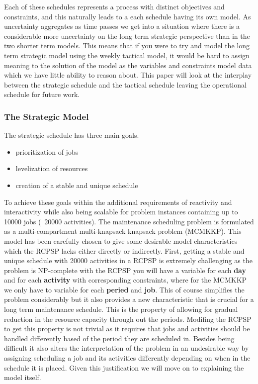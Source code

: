 \documentclass[runningheads]{llncs}
\begin{document}
Each of these schedules represents a process with distinct objectives and constraints, and this naturally leads to a each schedule having its own model. As uncertainty aggregates as time passes we get into a situation where there is a considerable more uncertainty on the long term strategic perspective than in the two shorter term models. This means that if you were to try and model the long term strategic model using the weekly tactical model, it would be hard to assign meaning to the solution of the model as the variables and constraints model data which we have little ability to reason about. This paper will look at the interplay between the strategic schedule and the tactical schedule leaving the operational schedule for future work. 

\subsubsection{The Strategic Model}
The strategic schedule has three main goals.

\begin{itemize}
    \item prioritization of jobs
    \item levelization of resources
    \item creation of a stable and unique schedule
\end{itemize}

To achieve these goals within the additional requirements of reactivity and interactivity while also being scalable for problem instances containing up to 10000 jobs (~20000 activities). The maintenance scheduling problem
is formulated as a multi-compartment multi-knapsack knapsack problem (MCMKKP). This model has been carefully chosen to give some desirable model characteristics which the RCPSP lacks either directly or indirectly. 
First, getting a stable and unique schedule with 20000 activities in a RCPSP is extremely challenging as the problem is NP-complete with the RCPSP you will have a variable 
for each \textbf{day} and for each \textbf{activity} with corresponding constraints, where for the MCMKKP we only have to variable for each \textbf{peried} and \textbf{job}. This of course simplifies the problem considerably
but it also provides a new characteristic that is crucial for a long term maintenance schedule. This is the property of allowing for gradual reduction in the resource capacity through out the periods. Modifing the RCPSP to get
this property is not trivial as it requires that jobs and activities should be handled differently based of the period they are scheduled in. Besides being difficult it also alters the interpretation of the problem
in an undesirable way by assigning scheduling a job and its activities differently depending on when in the schedule it is placed. Given this justification we will move on to explaining the model itself. 
\end{document}
